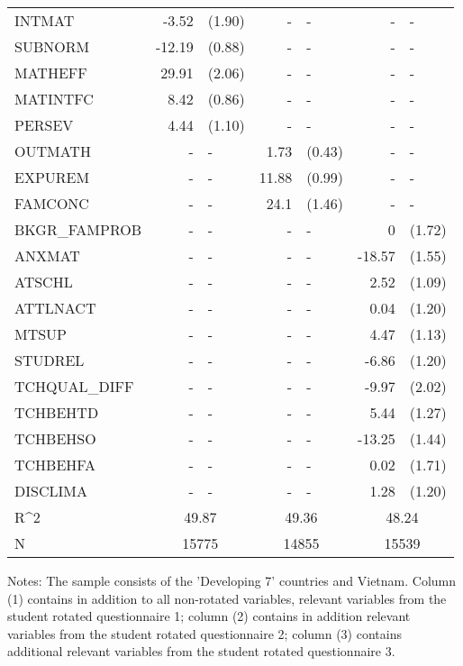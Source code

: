 \documentclass[10pt]{article}
\begin{document}
\begin{table}[H]
\begin{threeparttable}
\begin{tabular}{lrlrlrl}
				INTMAT & -3.52 & (1.90) & -     & -     & -     & - \\[0.2em]
				SUBNORM & -12.19 & (0.88) & -     & -     & -     & - \\[0.2em]
				MATHEFF & 29.91 & (2.06) & -     & -     & -     & - \\[0.2em]
				MATINTFC & 8.42  & (0.86) & -     & -     & -     & - \\[0.2em]
				PERSEV & 4.44  & (1.10) & -     & -     & -     & - \\[0.2em]
				OUTMATH & -     & -     & 1.73  & (0.43) & -     & - \\[0.2em]
				EXPUREM & -     & -     & 11.88 & (0.99) & -     & - \\[0.2em]
				FAMCONC & -     & -     & 24.1  & (1.46) & -     & - \\[0.2em]
				BKGR\_FAMPROB & -     & -     & -     & -     & 0     & (1.72) \\[0.2em]
				ANXMAT & -     & -     & -     & -     & -18.57 & (1.55) \\[0.2em]
				ATSCHL & -     & -     & -     & -     & 2.52  & (1.09) \\[0.2em]
				ATTLNACT & -     & -     & -     & -     & 0.04  & (1.20) \\[0.2em]
				MTSUP & -     & -     & -     & -     & 4.47  & (1.13) \\[0.2em]
				STUDREL & -     & -     & -     & -     & -6.86 & (1.20) \\[0.2em]
				TCHQUAL\_DIFF & -     & -     & -     & -     & -9.97 & (2.02) \\[0.2em]
				TCHBEHTD & -     & -     & -     & -     & 5.44  & (1.27) \\[0.2em]
				TCHBEHSO & -     & -     & -     & -     & -13.25 & (1.44) \\[0.2em]
				TCHBEHFA & -     & -     & -     & -     & 0.02  & (1.71) \\[0.2em]
				DISCLIMA & -     & -     & -     & -     & 1.28  & (1.20) \\[0.2em]				
				R^{2} & \multicolumn{2}{c}{49.87} & \multicolumn{2}{c}{49.36} & \multicolumn{2}{c}{48.24} \\
				N     & \multicolumn{2}{c}{15775} & \multicolumn{2}{c}{14855} & \multicolumn{2}{c}{15539} \\
				\bottomrule
			\end{tabular}%
			\begin{tablenotes}
				Notes: The sample consists of the 'Developing 7' countries and Vietnam. Column (1) contains in addition to all non-rotated variables, relevant variables from the student rotated questionnaire 1; column (2) contains in addition relevant variables from the student rotated questionnaire 2; column (3) contains additional relevant variables from the student rotated questionnaire 3. 
			\end{tablenotes}
		\end{threeparttable}
	\end{table}
	
\end{document}
